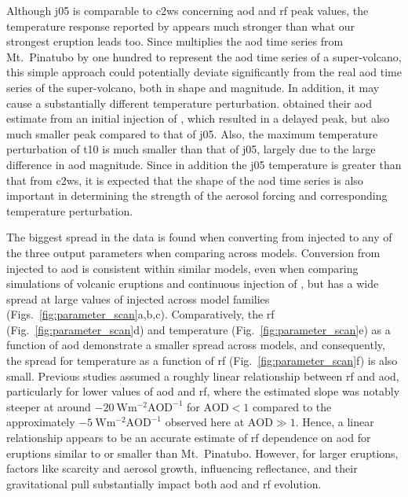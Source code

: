 \documentclass{ametsocV6.1}
\newcommand{\iso}[1][i]{{#1}njected \ce{SO2}}
\begin{document}
Although \gls{j05} is comparable to \gls{c2ws} concerning \gls{aod} and \gls{rf} peak
values, the temperature response reported by \citet{jones2005} appears much stronger
than what our strongest eruption leads too. Since \citet{jones2005} multiplies the
\gls{aod} time series from Mt.\ Pinatubo by one hundred to represent the \gls{aod} time
series of a super-volcano, this simple approach could potentially deviate significantly
from the real \gls{aod} time series of the super-volcano, both in shape and magnitude.
In addition, it may cause a substantially different temperature perturbation.
\citet{timmreck2010} obtained their \gls{aod} estimate from an initial injection of
, which resulted in a delayed peak, but also much smaller peak compared to that
of \gls{j05}. Also, the maximum temperature perturbation of \gls{t10} is much smaller
than that of \gls{j05}, largely due to the large difference in \gls{aod} magnitude.
Since in addition the \gls{j05} temperature is greater than that from \gls{c2ws}, it is
expected that the shape of the \gls{aod} time series is also important in determining
the strength of the aerosol forcing and corresponding temperature perturbation.

The biggest spread in the data is found when converting from \iso{} to any of the three
output parameters when comparing across models. Conversion from \iso{} to \gls{aod} is
consistent within similar models, even when comparing simulations of volcanic eruptions
\citep{timmreck2010} and continuous injection of  \citep{niemeier2015}, but has
a wide spread at large values of \iso{} across model families
(Figs.~\ref{fig:parameter_scan}a,b,c). Comparatively, the \gls{rf}
(Fig.~\ref{fig:parameter_scan}d) and temperature (Fig.~\ref{fig:parameter_scan}e) as a
function of \gls{aod} demonstrate a smaller spread across models, and consequently, the
spread for temperature as a function of \gls{rf} (Fig.~\ref{fig:parameter_scan}f) is
also small. Previous studies assumed a roughly linear relationship between \gls{rf} and
\gls{aod}, particularly for lower values of \gls{aod} and \gls{rf}, where the estimated
slope was notably steeper at around \(\SI{-20}{\watt\metre^{-2}\mathrm{AOD}^{-1}}\) for
\(\mathrm{AOD}<1\) compared to the approximately
\(\SI{-5}{\watt\metre^{-2}\mathrm{AOD}^{-1}}\) observed here at \(\mathrm{AOD}\gg1\).
Hence, a linear relationship appears to be an accurate estimate of \gls{rf} dependence
on \gls{aod} for eruptions similar to or smaller than Mt.\ Pinatubo. However, for larger
eruptions, factors like  scarcity and aerosol growth, influencing reflectance,
and their gravitational pull substantially impact both \gls{aod} and \gls{rf} evolution.
\end{document}
